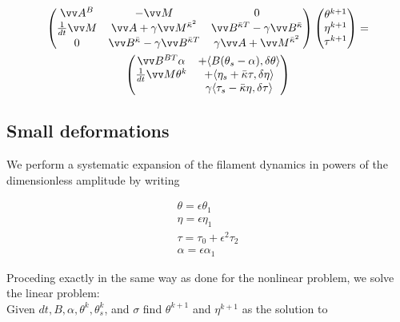 \begin{multline}
\label{eq:4}
\begin{pmatrix}
\vv A^B &  -\vv M & 0 \\
\frac{1}{dt} \vv M& 
 \vv A
+ \gamma \vv M^{\bar \kappa^2} &
 \vv B^{\bar\kappa T}
- \gamma\vv B^{\bar\kappa} \\
0 & 
 \vv B^{\bar\kappa}
- \gamma\vv B^{\bar\kappa T} 
&
%
%
\gamma \vv A
+ \vv M^{\bar \kappa^2}
\end{pmatrix}
%
\begin{pmatrix}
\theta^{k+1}\phantom{\big|\!\!}\\
\eta^{k+1}\phantom{\big|\!\!} \\
\tau^{k+1}\phantom{\big|\!\!}
\end{pmatrix}
=\\
\begin{pmatrix}
\vv B^{BT}\alpha & +\langle B(\theta_s-\alpha), \delta \theta\rangle\\
\frac{1}{dt} \vv M \theta^k& +\langle \eta_s+\bar\kappa\tau,\delta\eta\rangle
\\
&\gamma\langle\tau_{s}-\bar \kappa\eta, \delta\tau\rangle 
\end{pmatrix}
\end{multline}

\subsection{Small deformations}\label{small-deformations}

We perform a systematic expansion of the filament dynamics in powers of the dimensionless amplitude \epsilon by writing

$$
\begin{aligned}
\theta = \epsilon\theta_1 \\
\eta = \epsilon\eta_1 \\
\tau = \tau_0 + \epsilon^2 \tau_2 \\
\alpha = \epsilon \alpha_1
\end{aligned}
$$

Proceding exactly in the same way as done for the nonlinear problem, we solve the linear problem:\\
Given $dt, B, \alpha, \theta^k, \theta^k_s$, and $\sigma$ find
$\theta^{k+1}$ and $\eta^{k+1}$ as the solution to

